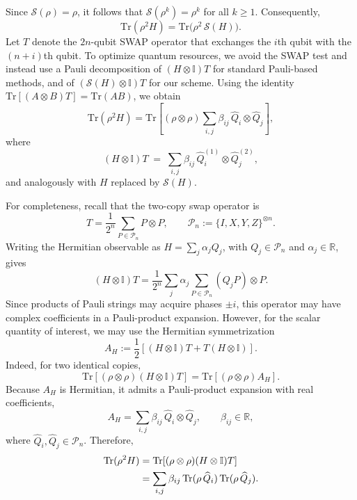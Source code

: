 \documentclass[prl,aps,notitlepage,superscriptaddress,showpacs,nofootinbib]{revtex4-2}
\begin{document}
Since $\mathcal{S}(\rho)=\rho$, it follows that $\mathcal{S}(\rho^k)=\rho^k$ for all $k\ge 1$. Consequently,
\begin{equation}
    \mathrm{Tr}(\rho^2 H)=\mathrm{Tr}\!\big(\rho^2\,\mathcal{S}(H)\big).
\end{equation}
Let $T$ denote the $2n$-qubit SWAP operator that exchanges the $i$th qubit with the $(n+i)$th qubit. To optimize quantum resources, we avoid the SWAP test and instead use a Pauli decomposition of $(H\otimes \mathbb{I})T$ for standard Pauli-based methods, and of $(\mathcal{S}(H)\otimes \mathbb{I})T$ for our scheme. Using the identity $\mathrm{Tr}[(A\otimes B)T]=\mathrm{Tr}(AB)$, we obtain
\begin{equation}
    \mathrm{Tr}(\rho^2 H)
    = \mathrm{Tr}\!\left[(\rho\otimes \rho)\sum_{i,j}\beta_{ij}\,\widehat{Q}_i\otimes \widehat{Q}_j\right],
    \label{eq:non_linear_decomp}
\end{equation}
where
\[
(H\otimes \mathbb{I})T \;=\; \sum_{i,j}\beta_{ij}\,\widehat{Q}_i^{(1)}\otimes \widehat{Q}_j^{(2)},
\]
and analogously with $H$ replaced by $\mathcal{S}(H)$.

For completeness, recall that the two-copy swap operator is
\begin{equation}
    T=\frac{1}{2^n}\sum_{P\in\mathcal{P}_n} P\otimes P,
    \qquad 
    \mathcal{P}_n:=\{I,X,Y,Z\}^{\otimes n}.
\end{equation}
Writing the Hermitian observable as
\(H=\sum_j\alpha_j Q_j\), with \(Q_j\in\mathcal{P}_n\) and
\(\alpha_j\in\mathbb{R}\), gives
\begin{equation}
    (H\otimes\mathbb{I})T
    =
    \frac{1}{2^n}\sum_j\alpha_j
    \sum_{P\in\mathcal{P}_n} (Q_jP)\otimes P .
\end{equation}
Since products of Pauli strings may acquire phases \(\pm i\), this
operator may have complex coefficients in a Pauli-product expansion.
However, for the scalar quantity of interest, we may use the Hermitian
symmetrization
\begin{equation}
    A_H
    :=
    \frac{1}{2}\left[(H\otimes\mathbb{I})T
    +T(H\otimes\mathbb{I})\right].
\end{equation}
Indeed, for two identical copies,
\begin{equation}
    \mathrm{Tr}\!\left[(\rho\otimes\rho)(H\otimes\mathbb{I})T\right]
    =
    \mathrm{Tr}\!\left[(\rho\otimes\rho)A_H\right].
\end{equation}
Because \(A_H\) is Hermitian, it admits a Pauli-product expansion with
real coefficients,
\begin{equation}
    A_H=\sum_{i,j}\beta_{ij}\,
    \widehat{Q}_i\otimes\widehat{Q}_j,
    \qquad \beta_{ij}\in\mathbb{R},
\end{equation}
where \(\widehat{Q}_i,\widehat{Q}_j\in\mathcal{P}_n\). Therefore,
\begin{align}
    \mathrm{Tr}(\rho^2H)
    &=
    \mathrm{Tr}\!\left[(\rho\otimes\rho)(H\otimes\mathbb{I})T\right]  \notag\\
    &=
    \sum_{i,j}\beta_{ij}\,
    \mathrm{Tr}(\rho\,\widehat{Q}_i)\,
    \mathrm{Tr}(\rho\,\widehat{Q}_j).
\end{align}
\end{document}
